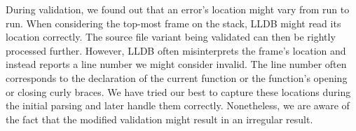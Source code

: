 During validation, we found out that an error's location might vary from run 
to run. 
When considering the top-most frame on the stack, LLDB might read its 
location correctly. 
The source file variant being validated can then be rightly processed further. 
However, LLDB often misinterprets the frame's location and instead reports 
a line number we might consider invalid. 
The line number often corresponds to the declaration of the current function 
or the function's opening or closing curly braces. 
We have tried our best to capture these locations during the initial parsing 
and later handle them correctly. 
Nonetheless, we are aware of the fact that the modified validation might 
result in an irregular result.